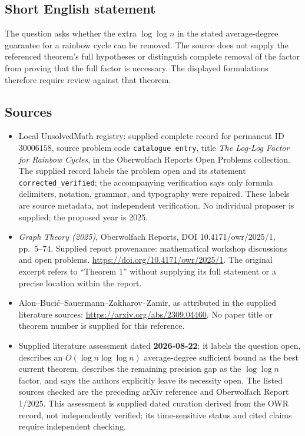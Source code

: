 \documentclass[11pt]{article}
\begin{document}
\subsection{Short English statement}
The question asks whether the extra \(\log\log n\) in the stated average-degree guarantee for a rainbow cycle can be removed. The source does not supply the referenced theorem's full hypotheses or distinguish complete removal of the factor from proving that the full factor is necessary. The displayed formulations therefore require review against that theorem.
\subsection{Sources}
\begin{itemize}
\item Local UnsolvedMath registry: supplied complete record for permanent ID \(30006158\), source problem code \texttt{catalogue entry}, title \emph{The Log-Log Factor for Rainbow Cycles}, in the Oberwolfach Reports Open Problems collection. The supplied record labels the problem open and its statement \texttt{corrected\_verified}; the accompanying verification says only formula delimiters, notation, grammar, and typography were repaired. These labels are source metadata, not independent verification. No individual proposer is supplied; the proposed year is 2025.
\item \emph{Graph Theory (2025)}, Oberwolfach Reports, DOI 10.4171/owr/2025/1, pp.\ 5--74. Supplied report provenance: mathematical workshop discussions and open problems. \url{https://doi.org/10.4171/owr/2025/1}. The original excerpt refers to ``Theorem 1'' without supplying its full statement or a precise location within the report.
\item Alon--Bucić--Sauermann--Zakharov--Zamir, as attributed in the supplied literature sources: \url{https://arxiv.org/abs/2309.04460}. No paper title or theorem number is supplied for this reference.
\item Supplied literature assessment dated \textbf{2026-08-22}: it labels the question open, describes an \(O(\log n\log\log n)\) average-degree sufficient bound as the best current theorem, describes the remaining precision gap as the \(\log\log n\) factor, and says the authors explicitly leave its necessity open. The listed sources checked are the preceding arXiv reference and Oberwolfach Report 1/2025. This assessment is supplied dated curation derived from the OWR record, not independently verified; its time-sensitive status and cited claims require independent checking.
\end{itemize}
\end{document}

